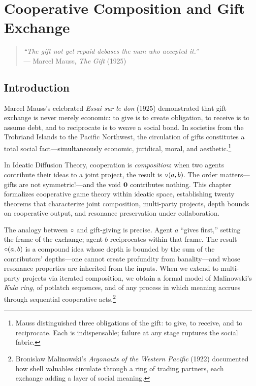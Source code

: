 \chapter{Cooperative Composition and Gift Exchange}
\label{ch:cooperative}

\begin{quote}
\textit{``The gift not yet repaid debases the man who accepted it.''}\\
--- Marcel Mauss, \textit{The Gift} (1925)
\end{quote}

\vspace{1em}

\section{Introduction}

Marcel Mauss's celebrated \textit{Essai sur le don} (1925) demonstrated that
gift exchange is never merely economic: to give is to create obligation, to
receive is to assume debt, and to reciprocate is to weave a social bond.
In societies from the Trobriand Islands to the Pacific Northwest, the
circulation of gifts constitutes a total social fact---simultaneously
economic, juridical, moral, and aesthetic.\footnote{Mauss distinguished three
obligations of the gift: to give, to receive, and to reciprocate. Each is
indispensable; failure at any stage ruptures the social fabric.}

In Ideatic Diffusion Theory, cooperation is \emph{composition}: when two agents
contribute their ideas to a joint project, the result is $\circ(a, b)$.
The order matters---gifts are not symmetric!---and the void $\mathbf{0}$
contributes nothing.  This chapter formalizes cooperative game theory within
ideatic space, establishing twenty theorems that characterize joint
composition, multi-party projects, depth bounds on cooperative output, and
resonance preservation under collaboration.

The analogy between $\circ$ and gift-giving is precise.  Agent $a$
``gives first,'' setting the frame of the exchange; agent $b$ reciprocates
within that frame.  The result $\circ(a,b)$ is a compound idea whose
depth is bounded by the sum of the contributors' depths---one cannot create
profundity from banality---and whose resonance properties are inherited from
the inputs.  When we extend to multi-party projects via iterated
composition, we obtain a formal model of Malinowski's \textit{Kula ring}, of
potlatch sequences, and of any process in which meaning accrues through
sequential cooperative acts.\footnote{Bronislaw Malinowski's
\textit{Argonauts of the Western Pacific} (1922) documented how shell
valuables circulate through a ring of trading partners, each exchange adding
a layer of social meaning.}

